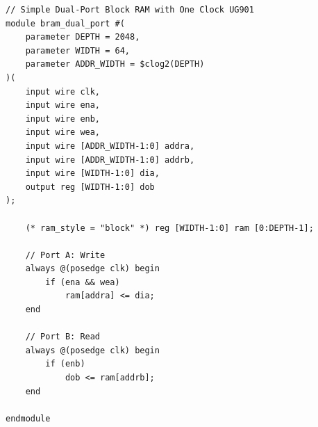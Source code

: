 \begin{lstlisting}[style={prettyverilog}, caption={Verilog code for dual-port BRAM used in \texttt{fft\_reorderer.v}.}, label={lst:verilog_dual_port_bram}]
// Simple Dual-Port Block RAM with One Clock UG901
module bram_dual_port #(
    parameter DEPTH = 2048,
    parameter WIDTH = 64,
    parameter ADDR_WIDTH = $clog2(DEPTH)
)(
    input wire clk,
    input wire ena,
    input wire enb,
    input wire wea,
    input wire [ADDR_WIDTH-1:0] addra,
    input wire [ADDR_WIDTH-1:0] addrb,
    input wire [WIDTH-1:0] dia,
    output reg [WIDTH-1:0] dob
);

    (* ram_style = "block" *) reg [WIDTH-1:0] ram [0:DEPTH-1];

    // Port A: Write
    always @(posedge clk) begin
        if (ena && wea)
            ram[addra] <= dia;
    end

    // Port B: Read
    always @(posedge clk) begin
        if (enb)
            dob <= ram[addrb];
    end

endmodule
\end{lstlisting}

